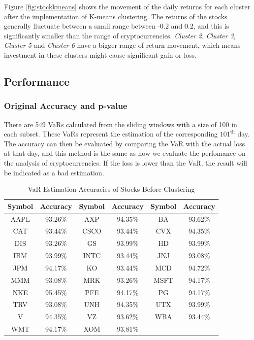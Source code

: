 \documentclass[11pt]{article} %
\theoremstyle{plain}
\theoremstyle{definition}
\begin{document}
Figure \ref{fig:stockkmeans} shows the movement of the daily returns for each cluster after the implementation of K-means clustering. The returns of the stocks generally fluctuate between a small range between -0.2 and 0.2, and this is significantly smaller than the range of cryptocurrencies. \textsl{Cluster 2}, \textsl{Cluster 3}, \textsl{Cluster 5} and \textsl{Cluster 6} have a bigger range of return movement, which means investment in these clusters might cause significant gain or loss.

\subsection{Performance}

\subsubsection{Original Accuracy and p-value}

There are 549 VaRs calculated from the sliding windows with a size of 100 in each subset. These VaRs represent the estimation of the corresponding $101^{\mathrm{th}}$ day. The accuracy can then be evaluated by comparing the VaR with the actual loss at that day, and this method is the same as how we evaluate the perfomance on the analysis of cryptocurrencies. If the loss is lower than the VaR, the result will be indicated as a bad estimation.

{
  \begin{table}[ht]
    \centering
    \small
    \begin{tabular}{|c|c|c|c|c|c|}
        \hline
        Symbol & Accuracy & Symbol & Accuracy & Symbol & Accuracy \\
        \hline
        AAPL & 93.26\% & AXP & 94.35\% & BA & 93.62\% \\
        CAT & 93.44\% & CSCO & 93.44\% & CVX & 94.35\% \\
        DIS & 93.26\% & GS & 93.99\% & HD & 93.99\% \\
        IBM & 93.99\% & INTC & 93.44\% & JNJ & 93.08\% \\
        JPM & 94.17\% & KO & 93.44\% & MCD & 94.72\% \\
        MMM & 93.08\% & MRK & 93.26\% & MSFT & 94.17\% \\
        NKE & 95.45\% & PFE & 94.17\% & PG & 94.17\% \\
        TRV & 93.08\% & UNH & 94.35\% & UTX & 93.99\% \\
        V & 94.35\% & VZ & 93.62\% & WBA & 93.44\% \\
        WMT & 94.17\% & XOM & 93.81\% & & \\
        \hline
    \end{tabular}
    \caption{VaR Estimation Accuracies of Stocks Before Clustering}
    \label{table:accstockbefore}
  \end{table}
}
\end{document}
